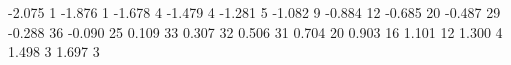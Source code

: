-2.075 1
-1.876 1
-1.678 4
-1.479 4
-1.281 5
-1.082 9
-0.884 12
-0.685 20
-0.487 29
-0.288 36
-0.090 25
0.109 33
0.307 32
0.506 31
0.704 20
0.903 16
1.101 12
1.300 4
1.498 3
1.697 3
